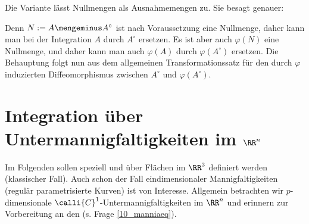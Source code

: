 \begin{antwort}
  Die Variante lässt Nullmengen als Ausnahmemengen zu. Sie besagt 
  genauer: 

  \medskip%
  \noindent

  \medskip\noindent
  Denn $N:=A\mengeminus A^\circ$ ist nach Voraussetzung eine Nullmenge, 
  daher kann man bei der Integration $A$ durch $A^\circ$ ersetzen. 
  Es ist aber auch $\varphi(N)$ eine Nullmenge, und daher kann man auch 
  $\varphi(A)$ durch $\varphi(A^\circ)$ ersetzen. Die Behauptung folgt 
  nun aus dem allgemeinen Transformationssatz für den durch $\varphi$ 
  induzierten Diffeomorphismus zwischen $A^\circ$ und $\varphi(A^\circ)$. 
  \AntEnd
\end{antwort} 





\section{Integration über Untermannigfaltigkeiten im $\RR^n$}

Im Folgenden sollen speziell  und 
 über Flächen im $\RR^3$ definiert werden 
(klassischer Fall). Auch schon der Fall eindimensionaler Mannigfaltigkeiten 
(regulär parametrisierte Kurven) ist von Interesse. Allgemein betrachten 
wir $p$-dimensionale $\calli{C}^1$-Untermannigfaltigkeiten im $\RR^n$ 
und erinnern zur Vorbereitung an den 
(s. Frage \ref{10_manniaeq}). 

